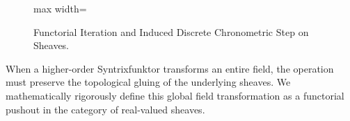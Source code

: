 \documentclass[
    12pt,
    a4paper,
    headings=normal,
    twoside=true,
    BCOR=8mm,
]{scrbook}
\makeatletter
\let\text\@firstofone
\let\mathfrak\@firstofone
\def\tau{tau}%
\makeatother
\begin{document}
\begin{figure}[htbp]
\centering
\begin{adjustbox}{max width=\textwidth}\end{adjustbox}
\caption{Functorial Iteration and Induced Discrete Chronometric Step on Sheaves.}
\label{fig:functorial_chronometry_ch4}
\end{figure}

When a higher-order Syntrixfunktor transforms an entire field, the operation must preserve the topological gluing of the underlying sheaves. We mathematically rigorously define this global field transformation as a functorial pushout in the category of real-valued sheaves.
\end{document}
